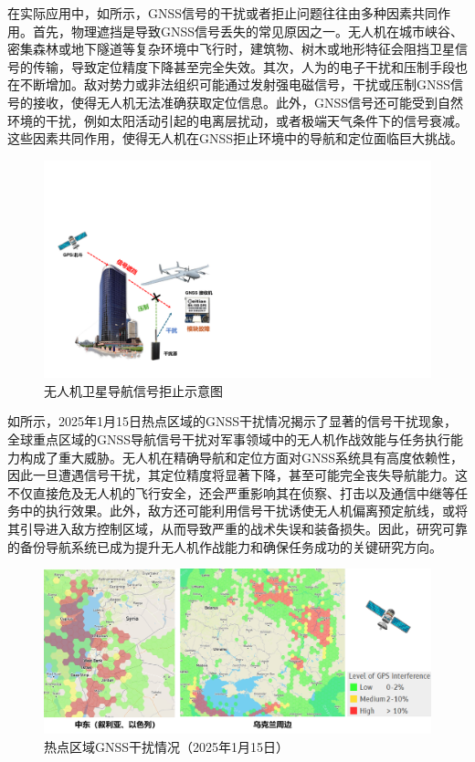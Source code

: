 \documentclass[12pt]{article}
\begin{document}
在实际应用中，如所示，GNSS信号的干扰或者拒止问题往往由多种因素共同作用。首先，物理遮挡是导致GNSS信号丢失的常见原因之一\cite{BJHK202004019}。无人机在城市峡谷、密集森林或地下隧道等复杂环境中飞行时，建筑物、树木或地形特征会阻挡卫星信号的传输，导致定位精度下降甚至完全失效。其次，人为的电子干扰和压制手段也在不断增加。敌对势力或非法组织可能通过发射强电磁信号，干扰或压制GNSS信号的接收，使得无人机无法准确获取定位信息。此外，GNSS信号还可能受到自然环境的干扰，例如太阳活动引起的电离层扰动，或者极端天气条件下的信号衰减。这些因素共同作用，使得无人机在GNSS拒止环境中的导航和定位面临巨大挑战。

\begin{figure}[t]
	\centering
	\includegraphics[width=0.8\linewidth]{figures//GNSS拒止示意图.pdf}
	\caption{无人机卫星导航信号拒止示意图}
	\label{noGNSS}
\end{figure}

如所示，2025年1月15日热点区域的GNSS干扰情况揭示了显著的信号干扰现象，全球重点区域的GNSS导航信号干扰对军事领域中的无人机作战效能与任务执行能力构成了重大威胁。无人机在精确导航和定位方面对GNSS系统具有高度依赖性，因此一旦遭遇信号干扰，其定位精度将显著下降，甚至可能完全丧失导航能力。这不仅直接危及无人机的飞行安全，还会严重影响其在侦察、打击以及通信中继等任务中的执行效果。此外，敌方还可能利用信号干扰诱使无人机偏离预定航线，或将其引导进入敌方控制区域，从而导致严重的战术失误和装备损失。因此，研究可靠的备份导航系统已成为提升无人机作战能力和确保任务成功的关键研究方向。


\begin{figure}[H]
	\centering
	\includegraphics[width=\linewidth]{figures/热点区域GPS干扰情况.png}
	\caption{热点区域GNSS干扰情况（2025年1月15日）}
    \label{GNSSregion}
\end{figure}
\end{document}
